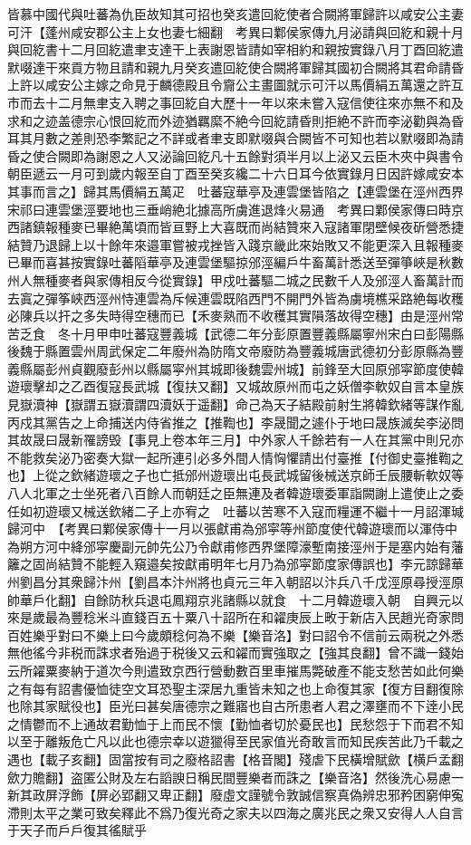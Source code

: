 皆慕中國代與吐蕃為仇臣故知其可招也癸亥遣回紇使者合闕將軍歸許以咸安公主妻可汗【蓬州咸安郡公主上女也妻七細翻　考異曰鄴侯家傳九月泌請與回紇和親十月與回紇書十二月回紇遣聿支達干上表謝恩皆請如宰相約和親按實錄八月丁酉回紇遣默啜達干來貢方物且請和親九月癸亥遣回紇使合闕將軍歸其國初合闕將其君命請昏上許以咸安公主嫁之命見于麟德殿且令齎公主畫圖就示可汗以馬價絹五萬還之許互市而去十二月無聿支入聘之事回紇自大歷十一年以來未嘗入寇信使往來亦無不和及求和之迹盖德宗心恨回紇而外迹猶羈縻不絶今回紇請昏則拒絶不許而李泌勸與為昏耳其月數之差則恐李繁記之不詳或者聿支即默啜與合闕皆不可知也若以默啜即為請昏之使合闕即為謝恩之人又泌論回紇凡十五餘對須半月以上泌又云臣木夾中與書令朝臣遞云一月可到歲内報至自丁酉至癸亥纔二十六日耳今依實錄月日因許嫁咸安本其事而言之】歸其馬價絹五萬疋　吐蕃寇華亭及連雲堡皆陷之【連雲堡在涇州西界宋祁曰連雲堡涇要地也三垂峭絶北據高所虜進退烽火易通　考異曰鄴侯家傳曰時京西諸鎮報種麥已畢絶萬頃而皆亘野上大喜既而尚結贊來入寇諸軍閉壁候夜斫營悉捷結贊乃退歸上以十餘年來邉軍嘗被戎挫皆入踐京畿此來始敗又不能更深入且報種麥已畢而喜甚按實錄吐蕃䧟華亭及連雲堡驅掠邠涇編戶牛畜萬計悉送至彈箏峽是秋數州人無種麥者與家傳相反今從實錄】甲戍吐蕃驅二城之民數千人及邠涇人畜萬計而去寘之彈筝峽西涇州恃連雲為斥候連雲既陷西門不開門外皆為虜境樵采路絶每收穫必陳兵以扞之多失時得空穗而已【禾麥熟而不收穫其實隕落故得空穗】由是涇州常苦乏食　冬十月甲申吐蕃寇豐義城【武德二年分彭原置豐義縣屬寧州宋白曰彭陽縣後魏于縣置雲州周武保定二年廢州為防隋文帝廢防為豐義城唐武德初分彭原縣為豐義縣屬彭州貞觀廢彭州以縣屬寜州其城即後魏雲州城】前鋒至大回原邠寜節度使韓遊瓌擊却之乙酉復寇長武城【復扶又翻】又城故原州而屯之妖僧李軟奴自言本皇族見嶽瀆神【嶽謂五嶽瀆謂四瀆妖于遥翻】命己為天子結殿前射生將韓欽緒等謀作亂丙戍其黨告之上命捕送内侍省推之【推鞫也】李晟聞之遽仆于地曰晟族滅矣李泌問其故晟曰晟新罹謗毁【事見上卷本年三月】中外家人千餘若有一人在其黨中則兄亦不能救矣泌乃密奏大獄一起所連引必多外間人情恟懼請出付臺推【付御史臺推鞫之也】上從之欽緒遊瓌之子也亡抵邠州遊瓌出屯長武城留後械送京師壬辰腰斬軟奴等八人北軍之士坐死者八百餘人而朝廷之臣無連及者韓遊瓌委軍詣闕謝上遣使止之委任如初遊瓌又械送欽緒二子上亦宥之　吐蕃以苦寒不入寇而糧運不繼十一月詔渾瑊歸河中　【考異曰鄴侯家傳十一月以張獻甫為邠寜等州節度使代韓遊瓌而以渾侍中為朔方河中絳邠寜慶副元帥先公乃令獻甫修西界堡障濠塹南接涇州于是塞内始有藩籬之固尚結贊不能輕入窺邉矣按獻甫明年七月乃為邠寜節度家傳誤也】李元諒歸華州劉昌分其衆歸汴州【劉昌本汴州將也貞元三年入朝詔以汴兵八千戊涇原尋授涇原帥華戶化翻】自餘防秋兵退屯鳳翔京兆諸縣以就食　十二月韓遊瓌入朝　自興元以來是歲最為豐稔米斗直錢百五十粟八十詔所在和糴庚辰上畋于新店入民趙光奇家問百姓樂乎對曰不樂上曰今歲頗稔何為不樂【樂音洛】對曰詔令不信前云兩税之外悉無他徭今非税而誅求者殆過于税後又云和糴而實強取之【強其良翻】曾不識一錢始云所糴粟麥納于道次今則遣致京西行營動數百里車摧馬斃破產不能支愁苦如此何樂之有每有詔書優恤徒空文耳恐聖主深居九重皆未知之也上命復其家【復方目翻復除也除其家賦役也】臣光曰甚矣唐德宗之難寤也自古所患者人君之澤壅而不下逹小民之情鬱而不上通故君勤恤于上而民不懷【勤恤者切於憂民也】民愁怨于下而君不知以至于離叛危亡凡以此也德宗幸以遊獵得至民家值光奇敢言而知民疾苦此乃千載之遇也【載子亥翻】固當按有司之廢格詔書【格音閣】殘虐下民橫增賦歛【横戶孟翻歛力贍翻】盗匿公財及左右謟諛日稱民間豐樂者而誅之【樂音洛】然後洗心易慮一新其政屏浮飾【屏必郢翻又卑正翻】廢虛文謹號令敦誠信察真偽辨忠邪矜困窮伸寃滯則太平之業可致矣釋此不爲乃復光奇之家夫以四海之廣兆民之衆又安得人人自言于天子而戶戶復其徭賦乎

